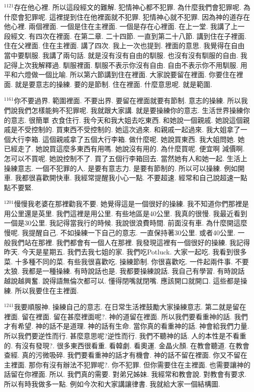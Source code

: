 \documentclass{book}
\begin{document}
$^{1121}$存在他心裡.
所以這段經文的難解.
犯情神心都不犯罪.
為什麼我們會犯罪呢.
為什麼會犯罪呢.
這裡提到住在他裡面就不犯罪.
犯情神心就不犯罪.
因為神的道存在他心裡.
兩個裡面.
一個是住在主裡面.
一個是存在心裡面.
在上一堂.
我講了上一段經文.
有四次在裡面.
在第二章.
二十四節.
一直到第二十八節.
講到住在子裡面.
住在父裡面.
住在主裡面.
講了四次.
我上一次也提到.
裡面的意思.
我覺得在自由當中要馴服.
我講了兩句話.
就是沒有沒有自由的馴服.
也沒有沒有馴服的自由.
我記得上次我解釋過.
馴服裡面.
馴服不表示你沒有自由.
自由不表示你不用馴服.
用平和六燈做一個比喻.
所以第六節講到住在裡面.
大家說要留在裡面.
你要住在裡面.
就是要意志的操練.
要的是節制.
住在裡面.
什麼意思呢.
就是範圍.

$^{1161}$你不要過界.
範圍裡面.
不要出界.
要留在裡面就要有節制.
意志的操練.
所以我們說我們怎樣能夠不犯罪呢.
我就跟大家講.
就是要操練你的意志.
生活世界操練你的意志.
很簡單 衣食住行.
我今天和我大姐去吃東西.
和她說一個親戚.
她說這個親戚是不受控制的.
買東西不受控制的.
她這次過來.
和親戚一起過來.
我大姐拿了一個大行李箱.
這個親戚拿了五個大行李箱.
做什麼呢.
她說買東西.
我大姐問她.
她已經走了.
她說買這麼多東西有用嗎.
她說沒有用的.
為什麼買呢.
便宜啊 減價啊.
怎可以不買呢.
她說控制不了.
買了五個行李箱回去.
當然她有人和她一起.
生活上操練意志.
一個不犯罪的人.
是要有意志力.
是要有節制的.
所以可以操練.
例如開車.
我都很喜歡開快車.
我經常提醒我小心一點.
不要超速.
經常和自己說超速一點點不要緊.

$^{1201}$慢慢我老婆在那裡勸我不要.
她覺得這是一個很好的操練.
我不知道你們那裡是用公里還是英里.
我們這裡是用公里.
有些地區是40公里.
我真的很慢.
我最近看到一個是30公里.
我記得當我行的時候.
我說很浪費時間.
前面沒有車.
為什麼開這麼慢呢.
我提醒自己.
不如操練一下自己的意志.
一直保持著30公里.
或者40公里.
一般我們站在那裡.
我們都會有一個人在那裡.
我發現這裡有一個很好的操練.
我記得昨天.
今天是星期五.
我們去我七姐的家.
我們吃Potluck.
大家一起吃.
我看到很多菜.
十多種不同的菜.
有些我很喜歡吃.
操練節制.
你很喜歡吃.
一件起兩件事.
不要太狼.
我都是一種操練.
有時說話也是.
我都要操練說話.
我自己有學習.
有時說話越說越興奮.
說得語無倫次都可以.
懂得閉嘴就閉嘴.
應該開口就開口.
這些都是操練.
所以我要住在主裡面.

$^{1241}$我要順服神.
操練自己的意志.
在日常生活裡鼓勵大家操練意志.
第二就是留在裡面.
留在裡面.
留在甚麼裡面呢?.
神的道留在裡面.
所以我們要看重神的話.
我們才有希望.
神的話不是道理.
神的話有生命.
當你真的看重神的話.
神會給我們力量.
所以我們要逆性而行.
甚麼意思呢?逆性而行.
我們不聽神的話.
人的本性是不看重的.
有沒有發現?.
很多東西很看重.
看韓劇.
看奧運.
金晶火顏.
在教會聽道.
在教會查經.
真的污微吸碎.
我們要看重神的話才有機會.
神的話不留在裡面.
你又不留在主裡面.
那你有沒有辦法不犯罪呢?.
你不犯罪.
但你需要住在主裡面.
也需要讓神的話留在你裡面.
所以.
我們真的需要.
對弟兄姊妹.
我經常和教會說.
對教會有要求.
所以有時我做多一點.
例如今次和大家講讓律書.
我就給大家一個結構圖.
\end{document}

